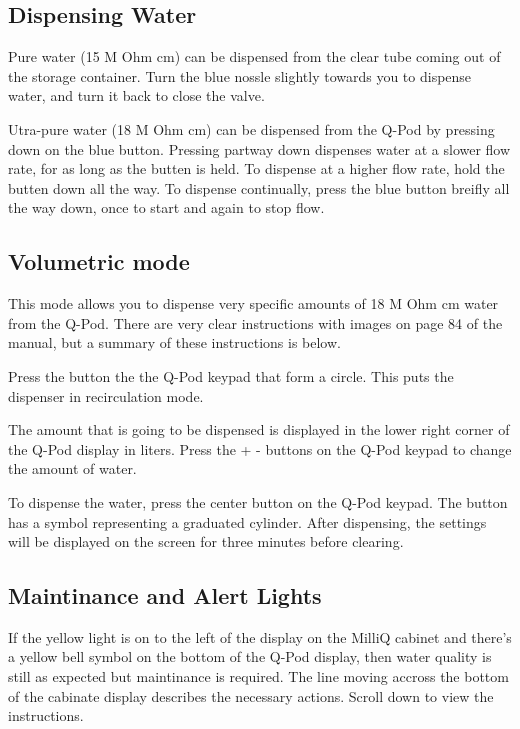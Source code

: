 \documentclass[12pt]{../SOP3_beta}\usepackage[]{graphicx}\usepackage[]{color}
\begin{document}
\subsection{Dispensing Water}

\NP Pure water (15 M Ohm cm) can be dispensed from the clear tube coming out of the storage container. Turn the blue nossle slightly towards you to dispense water, and turn it back to close the valve. 

\NP Utra-pure water (18 M Ohm cm) can be dispensed from the Q-Pod by pressing down on the blue button. Pressing partway down dispenses water at a slower flow rate, for as long as the butten is held. To dispense at a higher flow rate, hold the butten down all the way. To dispense continually, press the blue button breifly all the way down, once to start and again to stop flow.  

\subsection{Volumetric mode}

\NP This mode allows you to dispense very specific amounts of 18 M Ohm cm water from the Q-Pod. There are very clear instructions with images on page 84 of the manual, but a summary of these instructions is below.

\NP Press the button the the Q-Pod keypad that form a circle. This puts the dispenser in recirculation mode. 

\NP The amount that is going to be dispensed is displayed in the lower right corner of the Q-Pod display in liters. Press the + - buttons on the Q-Pod keypad to change the amount of water. 

\NP To dispense the water, press the center button on the Q-Pod keypad. The button has a symbol representing a graduated cylinder. After dispensing, the settings will be displayed on the screen for three minutes before clearing.

\subsection{Maintinance and Alert Lights}

\NP If the yellow light is on to the left of the display on the MilliQ cabinet and there's a yellow bell symbol on the bottom of the Q-Pod display, then water quality is still as expected but maintinance is required. The line moving accross the bottom of the cabinate display describes the necessary actions. Scroll down to view the instructions. 
\end{document}
